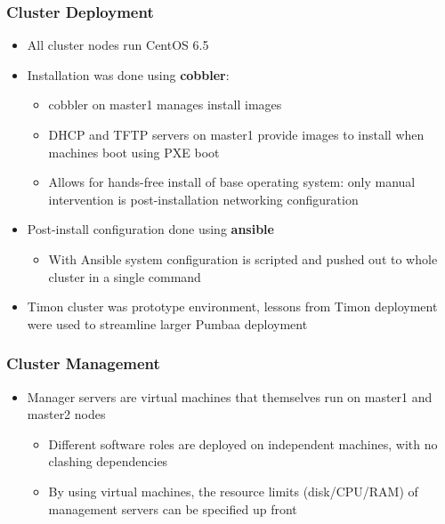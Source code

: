 \documentclass[handout]{beamer}
\begin{document}
\begin{frame}
\frametitle{Cluster Deployment}
\begin{itemize}
\item All cluster nodes run CentOS 6.5
\item Installation was done using \textbf{cobbler}:
\begin{itemize}
\item cobbler on master1 manages install images
\item DHCP and TFTP servers on master1 provide images to install when machines boot using PXE boot
\item Allows for hands-free install of base operating system: only manual intervention is post-installation networking configuration
\end{itemize}
\item Post-install configuration done using \textbf{ansible}
\begin{itemize}
\item With Ansible system configuration is scripted and pushed out to whole cluster in a single command
\end{itemize}
\item Timon cluster was prototype environment, lessons from Timon deployment were used to streamline larger Pumbaa deployment
\end{itemize}
\end{frame}

\begin{frame}
\frametitle{Cluster Management}
\begin{itemize}
\item Manager servers are virtual machines that themselves run on master1 and master2 nodes
\begin{itemize}
\item Different software roles are deployed on independent machines, with no clashing dependencies
\item By using virtual machines, the resource limits (disk/CPU/RAM) of management servers can be specified up front
\end{itemize}
\end{itemize}
\end{frame}
\end{document}
